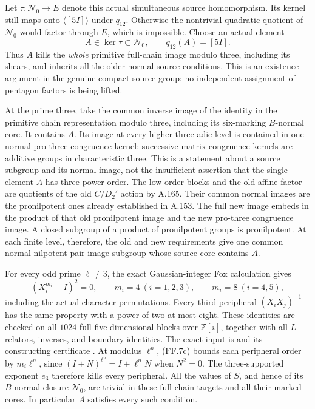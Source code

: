 Let $\tau:\mathcal N_0\to E$ denote this actual simultaneous
source homomorphism. Its kernel still maps onto
$\langle[5I]\rangle$ under $q_{12}$. Otherwise the nontrivial
quadratic quotient of $\mathcal N_0$ would factor through
$E$, which is impossible. Choose an actual element
\[
       A\in\ker\tau\subset\mathcal N_0,
                    \qquad q_{12}(A)=[5I].
 \tag{FF.7b}
\]
Thus $A$ kills the \emph{whole} primitive full-chain image
modulo three, including its shears, and inherits all the
older normal source conditions. This is an existence
argument in the genuine compact source group; no independent
assignment of pentagon factors is being lifted.

At the prime three, take the common inverse image of the
identity in the primitive chain representation modulo three,
including its six-marking $B$-normal core. It contains $A$.
Its image at every higher three-adic level is contained in
one normal pro-three congruence kernel: successive matrix
congruence kernels are additive groups in characteristic
three. This is a statement about a source subgroup and its
normal image, not the insufficient assertion that the single
element $A$ has three-power order. The low-order blocks and
the old affine factor are quotients of the old $C/D_2'$ action
by A.165. Their common normal images are the pronilpotent
ones already established in A.153. The full new image embeds
in the product of that old pronilpotent image and the new
pro-three congruence image. A closed subgroup of a product
of pronilpotent groups is pronilpotent. At each finite
level, therefore, the old and new requirements give one
common normal nilpotent pair-image subgroup whose source
core contains $A$.

For every odd prime $\ell\ne3$, the exact Gaussian-integer
Fox calculation gives
\[
       (X_i^{m_i}-I)^2=0,\qquad
       m_i=4\ (i=1,2,3),\qquad m_i=8\ (i=4,5),
 \tag{FF.7c}
\]
including the actual character permutations. Every third
peripheral $(X_iX_j)^{-1}$ has the same property with a
power of two at most eight. These identities are checked
on all $1024$ full five-dimensional blocks over
$\mathbb Z[i]$, together with all $L$ relators, inverses,
and boundary identities. The exact input is
and its constructing certificate
.
At modulus $\ell^n$, (FF.7c) bounds each peripheral order
by $m_i\ell^n$, since $(I+N)^{\ell^n}=I+\ell^nN$ when
$N^2=0$. The three-supported exponent $e_3$ therefore
kills every peripheral. All the values of $S$, and hence
of its $B$-normal closure $\mathcal N_0$, are trivial in
these full chain targets and all their marked cores.
In particular $A$ satisfies every such condition.

